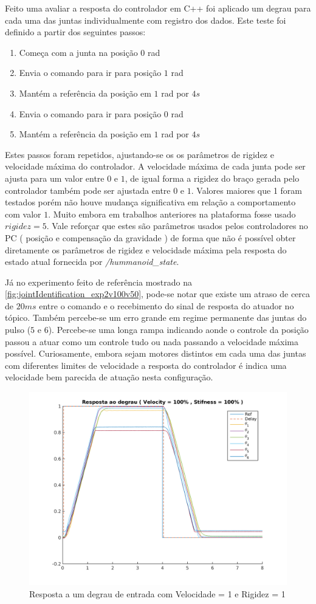 Feito uma avaliar a resposta do controlador em C++ foi aplicado um degrau para cada uma das juntas individualmente com registro dos dados. Este teste foi definido a partir dos seguintes passos:

\begin{enumerate}
    \item Começa com a junta na posição $0$ rad
    \item Envia o comando para ir para posição $1$ rad
    \item Mantém a referência da posição em $1$ rad por $4s$
    \item Envia o comando para ir para posição $0$ rad
    \item Mantém a referência da posição em $1$ rad por $4s$
\end{enumerate}

Estes passos foram repetidos, ajustando-se os os parâmetros de rigidez e velocidade máxima do controlador. A velocidade máxima de cada junta pode ser ajusta para um valor entre $0$ e $1$, de igual forma a rigidez do braço gerada pelo controlador também pode ser ajustada entre $0$ e $1$. Valores maiores que 1 foram testados porém não houve mudança significativa em relação a comportamento com valor $1$. Muito embora em trabalhos anteriores na plataforma fosse usado $rigidez = 5$. Vale reforçar que estes são parâmetros usados pelos controladores no PC ( posição e compensação da gravidade ) de forma que não é possível obter diretamente os parâmetros de rigidez e velocidade máxima pela resposta do estado atual fornecida por \textit{/hummanoid\_state}.

Já no experimento feito de referência mostrado na \ref{fig:jointIdentification_exp2v100v50}, pode-se notar que existe um atraso de cerca de $20ms$ entre o comando e o recebimento do sinal de resposta do atuador no tópico. Também percebe-se um erro grande em regime permanente das juntas do pulso ($5$ e $6$). Percebe-se uma longa rampa indicando aonde o controle da posição passou a atuar como um controle tudo ou nada passando a velocidade máxima possível. Curiosamente, embora sejam motores distintos em cada uma das juntas com diferentes limites de velocidade a resposta do controlador é indica uma velocidade bem parecida de atuação nesta configuração.

\begin{figure}[H]
    \centering
    \includegraphics[width=0.6\linewidth]{tex/figs/jointIdentification_exp1v100v100.png}
    \caption{Resposta a um degrau de entrada com Velocidade = 1 e Rigidez = 1}
    \label{fig:jointIdentification_exp1v100v100}
\end{figure}

